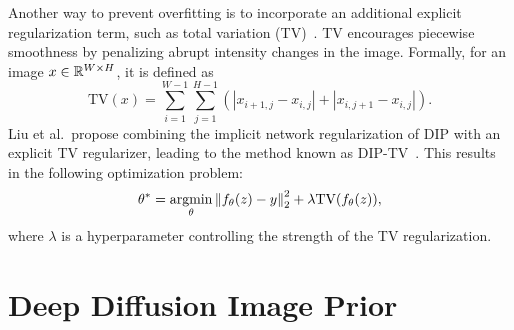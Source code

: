 Another way to prevent overfitting is to incorporate an additional explicit regularization term, such as total variation (TV)~\cite{TV}.
TV encourages piecewise smoothness by penalizing abrupt intensity changes in the image.
Formally, for an image $x \in \mathbb{R}^{W \times H}$, it is defined as
\begin{equation}
    \text{TV}(x) = \sum_{i=1}^{W-1} \sum_{j=1}^{H-1} (|x_{i+1,j} - x_{i,j}| + |x_{i,j+1} - x_{i,j}|).
\end{equation}
Liu et al.\ propose combining the implicit network regularization of DIP with an explicit TV regularizer, leading to the method known as DIP-TV~\cite{DIP-TV}.
This results in the following optimization problem:
\begin{equation}
    \theta^* = \operatorname*{argmin}_\theta \left\lVert f_\theta(z) - y\right\rVert_2^2 + \lambda \text{TV}(f_\theta(z)),
\end{equation}
where $\lambda$ is a hyperparameter controlling the strength of the TV regularization.

\section{Deep Diffusion Image Prior}


